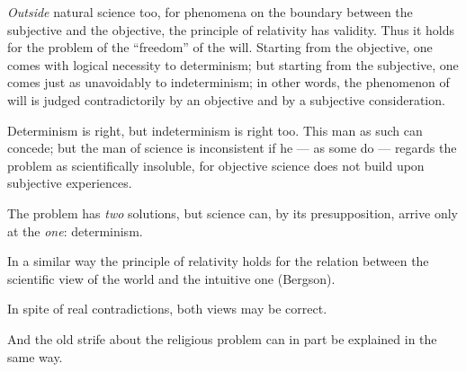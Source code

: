 \documentclass[12pt,a4paper]{article}
\begin{document}
\emph{Outside} natural science too, for phenomena on the boundary between the
subjective and the objective, the principle of relativity has validity. Thus
it holds for the problem of the ``freedom'' of the will. Starting from the
objective, one comes with logical necessity to determinism; but starting from
the subjective, one comes just as unavoidably to indeterminism; in other
words, the phenomenon of will is judged contradictorily by an objective and by
a subjective consideration.

Determinism is right, but indeterminism is right too. This man as such can
concede; but the man of science is inconsistent if he --- as some do ---
regards the problem as scientifically insoluble, for objective science does
not build upon subjective experiences.

The problem has \emph{two} solutions, but science can, by its presupposition,
arrive only at the \emph{one}: determinism.

In a similar way the principle of relativity holds for the relation between
the scientific view of the world and the intuitive one (Bergson).

In spite of real contradictions, both views may be correct.

And the old strife about the religious problem can in part be explained in the
same way.
\end{document}
